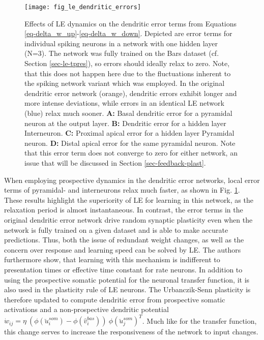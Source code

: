 \begin{figure}[h!]
  \centering
  \texttt{[image: fig\_le\_dendritic\_errors]}
  \caption[Effects of LE dynamics on dendritic error]{Effects of LE dynamics on the dendritic error terms from Equations
    \ref{eq-delta_w_up}-\ref{eq-delta_w_down}. Depicted are error terms for individual spiking neurons in a network with
    one hidden layer (N=3). The network was fully trained on the Bars dataset (cf. Section \ref{sec-le-tpres}), so
    errors should ideally relax to zero. Note, that this does not happen here due to the fluctuations inherent to the
    spiking network variant which was employed. In the original dendritic error network (orange), dendritic errors
    exhibit longer and more intense deviations, while errors in an identical LE network (blue) relax much sooner.
    \textbf{A:} Basal dendritic error for a pyramidal neuron at the output layer. \textbf{B:} Dendritic error for a
    hidden layer Interneuron. \textbf{C:} Proximal apical error for a hidden layer Pyramidal neuron. \textbf{D:} Distal
    apical error for the same pyramidal neuron. Note that this error term does not converge to zero for either network,
    an issue that will be discussed in Section \ref{sec-feedback-plast}.}
  \label{fig-error-comp-le}
\end{figure}


When employing prospective dynamics in the dendritic error networks, local error terms of pyramidal- and interneurons
relax much faster, as shown in Fig. \ref{fig-error-comp-le}. These results highlight the superiority of LE for learning
in this network, as the relaxation period is almost instantaneous. In contrast, the error terms in the original
dendritic error network drive random synaptic plasticity even when the network is fully trained on a given dataset and
is able to make accurate predictions. Thus, both the issue of redundant weight changes, as well as the concern over
response and learning speed can be solved by LE. The authors furthermore show, that learning with this mechanism is
indifferent to presentation times or effective time constant for rate neurons. In addition to using the prospective
somatic potential for the neuronal transfer function, it is also used in the plasticity rule of LE neurons. The
Urbanczik-Senn plasticity is therefore updated to compute dendritic error from prospective somatic activations and a
non-prospective dendritic potential $\dot{w}_{ij}= \eta \ ( \phi(\breve{u}_i^{som}) - \phi(\hat{v}_i^{bas}) ) \
  \phi(\breve{u}_j^{som})^T$. Much like for the transfer function, this change serves to increase the responsiveness of
the network to input changes.

